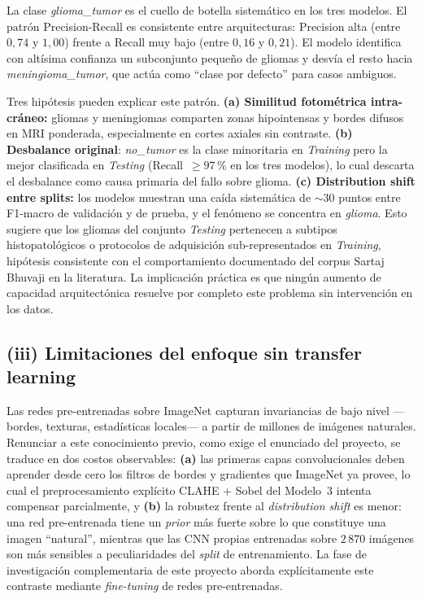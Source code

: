 La clase \textit{glioma\_tumor} es el cuello de botella
sistemático en los tres modelos. El patrón Precision-Recall es
consistente entre arquitecturas: Precision alta
(entre $0{,}74$ y $1{,}00$) frente a Recall muy bajo (entre
$0{,}16$ y $0{,}21$). El modelo identifica con altísima
confianza un subconjunto pequeño de gliomas y desvía el resto
hacia \textit{meningioma\_tumor}, que actúa como ``clase por
defecto'' para casos ambiguos.

Tres hipótesis pueden explicar este patrón. \textbf{(a)
Similitud fotométrica intra-cráneo:} gliomas y meningiomas
comparten zonas hipointensas y bordes difusos en MRI
ponderada, especialmente en cortes axiales sin contraste.
\textbf{(b) Desbalance original}: \textit{no\_tumor} es la
clase minoritaria en \textit{Training} pero la mejor clasificada
en \textit{Testing} (Recall~$\geq 97$\,\% en los tres modelos),
lo cual descarta el desbalance como causa primaria del fallo
sobre glioma. \textbf{(c) Distribution shift entre splits:}
los modelos muestran una caída sistemática de $\sim 30$ puntos
entre F1-macro de validación y de prueba, y el fenómeno se
concentra en \textit{glioma}. Esto sugiere que los gliomas del
conjunto \textit{Testing} pertenecen a subtipos histopatológicos
o protocolos de adquisición sub-representados en
\textit{Training}, hipótesis consistente con el comportamiento
documentado del corpus Sartaj Bhuvaji en la literatura. La
implicación práctica es que ningún aumento de capacidad
arquitectónica resuelve por completo este problema sin
intervención en los datos.

\subsection*{(iii) Limitaciones del enfoque sin transfer learning}

Las redes pre-entrenadas sobre ImageNet capturan invariancias
de bajo nivel ---bordes, texturas, estadísticas locales--- a
partir de millones de imágenes naturales. Renunciar a este
conocimiento previo, como exige el enunciado del proyecto, se
traduce en dos costos observables: \textbf{(a)} las primeras
capas convolucionales deben aprender desde cero los filtros de
bordes y gradientes que ImageNet ya provee, lo cual el
preprocesamiento explícito CLAHE + Sobel del Modelo~3 intenta
compensar parcialmente, y \textbf{(b)} la robustez frente al
\textit{distribution shift} es menor: una red pre-entrenada
tiene un \textit{prior} más fuerte sobre lo que constituye
una imagen ``natural'', mientras que las CNN propias entrenadas
sobre $2\,870$ imágenes son más sensibles a peculiaridades del
\textit{split} de entrenamiento. La fase de investigación
complementaria de este proyecto aborda explícitamente este
contraste mediante \textit{fine-tuning} de redes pre-entrenadas.

